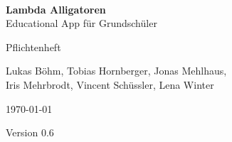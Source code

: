 \documentclass{scrartcl}
\begin{document}
\begin{titlepage}
\begin{center}
\begin{minipage}{0.4\textwidth}
	\begin{flushleft} \large
	\end{flushleft}
\end{minipage}
\begin{minipage}{0.4\textwidth}
	\begin{flushright} \large
	\end{flushright}
\end{minipage} \\[2cm]
\end{center}
\begin{center}
	{\huge \bfseries Lambda Alligatoren}\\[0.1cm] 
	{\large Educational App für Grundschüler}
\end{center}


\begin{center}
	{\Large Pflichtenheft}\\[0.5cm]
\end{center}
\begin{center}
	{Lukas Böhm, Tobias Hornberger, Jonas Mehlhaus, \\ Iris Mehrbrodt, Vincent Schüssler, Lena Winter} \\[1cm]
\end{center}

\begin{center}
	{\large \today}
\end{center}
	
	
	\begin{center}
	\end{center}
	\vfill

\begin{center}
	{\large Version 0.6}
\end{center}

\end{titlepage}

\iffalse
\title{Pflichtenheft}
\author{ 
	Lukas Böhm\and 
	Tobias Hornberger\and 
	Jonas Mehlhaus\and 
	Iris Mehrbrodt\and 
	Vincent Schüßler \and 
	Lena Winter
}
\date{\today}

\maketitle
\thispagestyle{empty}

\fi
{}

\clearpage
\pagestyle{empty}
\tableofcontents

\clearpage
\pagestyle{plain}
\setcounter{page}{1}











\end{document}

